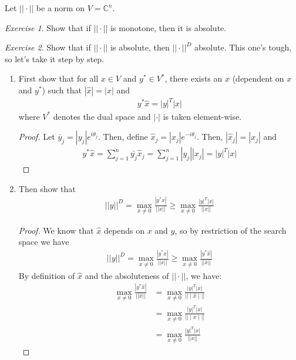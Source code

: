 \documentclass[11pt]{article}
\newcommand{\C}{\ensuremath{\mathbb C}}
\theoremstyle{plain}
\theoremstyle{definition}
\theoremstyle{remark}
\newtheorem{exc}{Exercise}[section]
\begin{document}
Let $||\cdot||$ be a norm on $V = \C^n$.

\begin{exc}
    Show that if $||\cdot||$ is monotone, then it is absolute.
\end{exc}

\begin{exc}
    Show that if $||\cdot||$ is absolute, then $||\cdot||^D$ absolute. This one's tough, so let's take it step by step.
    \begin{enumerate}
        \item First show that for all $x \in V$ and $y^* \in V^*$, there exists an $\hat{x}$ (dependent on $x$ and $y^*$) such that $|\hat{x}| = |x|$ and
        \begin{align*}
            y^* \hat{x} = |y|^T |x|
        \end{align*}
        where $V^*$ denotes the dual space and $|\cdot|$ is taken element-wise.
        \begin{proof}
            Let $\bar{y}_j = |y_j|e^{i \theta_j}$. Then, define $\hat{x}_j = |x_j| e^{-i\theta_j}$. Then, $|\hat{x}_j| = |x_j|$ and 
            \begin{align*}
                y^* \hat{x} = \sum_{j=1}^n \bar{y_j} \hat{x}_j = \sum_{j=1}^n |y_j| |x_j| = |y|^T |x|
            \end{align*}
        \end{proof}
        \item Then show that
        \begin{align*}
            ||y||^D = \max_{x \neq 0} \frac{|y^* x|}{||x||} \geq \max_{x \neq 0} \frac{|y|^T |x|}{||x||}
        \end{align*}
        \begin{proof}
            We know that $\hat{x}$ depends on $x$ and $y$, so by restriction of the search space we have
            \begin{align*}
                ||y||^D = \max_{x \neq 0} \frac{|y^* x|}{||x||} \geq \max_{x \neq 0} \frac{|y^* \hat{x}|}{||\hat{x}||}
            \end{align*}
            By definition of $\hat{x}$ and the absoluteness of $||\cdot||$, we have:
            \begin{align*}
                \max_{x \neq 0} \frac{|y^* \hat{x}|}{||\hat{x}||} &= \max_{x \neq 0} \frac{|y|^T |x|}{|| \mid \hat{x} \mid ||}\\
                &= \max_{x \neq 0} \frac{|y|^T |x|}{|| \mid x \mid ||}\\
                &= \max_{x \neq 0} \frac{|y|^T |x|}{|| x ||}

\end{align*}
\end{proof}
\end{enumerate}
\end{exc}
\end{document}
